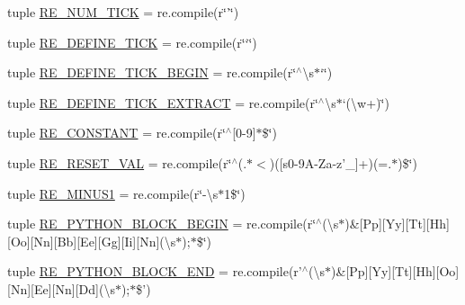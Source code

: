 \begin{DoxyCompactItemize}
\item 
tuple \hyperlink{namespacesrc_1_1regex_a7ff7ef8dfc5c6b803b01510174721810}{R\-E\-\_\-\-N\-U\-M\-\_\-\-T\-I\-C\-K} = re.\-compile(r\char`\"{}'\char`\"{})
\item 
tuple \hyperlink{namespacesrc_1_1regex_afc5659799b8ade9c9e05856a1e9a50d0}{R\-E\-\_\-\-D\-E\-F\-I\-N\-E\-\_\-\-T\-I\-C\-K} = re.\-compile(r\char`\"{}`\char`\"{})
\item 
tuple \hyperlink{namespacesrc_1_1regex_a61e835b717313b150306a906e77edd72}{R\-E\-\_\-\-D\-E\-F\-I\-N\-E\-\_\-\-T\-I\-C\-K\-\_\-\-B\-E\-G\-I\-N} = re.\-compile(r\char`\"{}$^\wedge$\textbackslash{}s$\ast$`\char`\"{})
\item 
tuple \hyperlink{namespacesrc_1_1regex_ac29035cc1727397ad2866ae568a2fffc}{R\-E\-\_\-\-D\-E\-F\-I\-N\-E\-\_\-\-T\-I\-C\-K\-\_\-\-E\-X\-T\-R\-A\-C\-T} = re.\-compile(r\char`\"{}$^\wedge$\textbackslash{}s$\ast$`(\textbackslash{}w+)\char`\"{})
\item 
tuple \hyperlink{namespacesrc_1_1regex_a561107014dfbb72a888014d41680fa3a}{R\-E\-\_\-\-C\-O\-N\-S\-T\-A\-N\-T} = re.\-compile(r\char`\"{}$^\wedge$\mbox{[}0-\/9\mbox{]}$\ast$\$\char`\"{})
\item 
tuple \hyperlink{namespacesrc_1_1regex_aed620bd129bd6111d9ae75c9477fac7d}{R\-E\-\_\-\-R\-E\-S\-E\-T\-\_\-\-V\-A\-L} = re.\-compile(r\char`\"{}$^\wedge$(.$\ast$$<$)(\mbox{[}s0-\/9\-A-\/\-Za-\/z'\-\_\-\mbox{]}+)(=.$\ast$)\$\char`\"{})
\item 
tuple \hyperlink{namespacesrc_1_1regex_a185c66d2fe426b18267b7a44c2325f9f}{R\-E\-\_\-\-M\-I\-N\-U\-S1} = re.\-compile(r\char`\"{}-\/\textbackslash{}s$\ast$1\$\char`\"{})
\item 
tuple \hyperlink{namespacesrc_1_1regex_a2ddc23515b8f7340050512d7f022759a}{R\-E\-\_\-\-P\-Y\-T\-H\-O\-N\-\_\-\-B\-L\-O\-C\-K\-\_\-\-B\-E\-G\-I\-N} = re.\-compile(r\char`\"{}$^\wedge$(\textbackslash{}s$\ast$)\&\mbox{[}Pp\mbox{]}\mbox{[}Yy\mbox{]}\mbox{[}Tt\mbox{]}\mbox{[}Hh\mbox{]}\mbox{[}Oo\mbox{]}\mbox{[}Nn\mbox{]}\mbox{[}Bb\mbox{]}\mbox{[}Ee\mbox{]}\mbox{[}Gg\mbox{]}\mbox{[}Ii\mbox{]}\mbox{[}Nn\mbox{]}(\textbackslash{}s$\ast$);$\ast$\$\char`\"{})
\item 
tuple \hyperlink{namespacesrc_1_1regex_a332ce422f61c277928427ffd195da6cf}{R\-E\-\_\-\-P\-Y\-T\-H\-O\-N\-\_\-\-B\-L\-O\-C\-K\-\_\-\-E\-N\-D} = re.\-compile(r'$^\wedge$(\textbackslash{}s$\ast$)\&\mbox{[}Pp\mbox{]}\mbox{[}Yy\mbox{]}\mbox{[}Tt\mbox{]}\mbox{[}Hh\mbox{]}\mbox{[}Oo\mbox{]}\mbox{[}Nn\mbox{]}\mbox{[}Ee\mbox{]}\mbox{[}Nn\mbox{]}\mbox{[}Dd\mbox{]}(\textbackslash{}s$\ast$);$\ast$\$')
$$
\end{DoxyCompactItemize}
